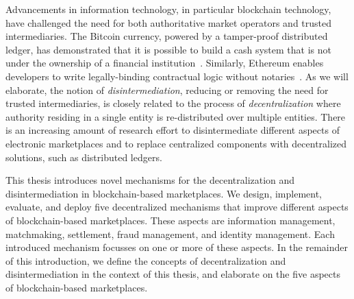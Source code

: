 Advancements in information technology, in particular blockchain technology, have challenged the need for both authoritative market operators and trusted intermediaries.
The Bitcoin currency, powered by a tamper-proof distributed ledger, has demonstrated that it is possible to build a cash system that is not under the ownership of a financial institution~\cite{nakamoto2008bitcoin}.
Similarly, Ethereum enables developers to write legally-binding contractual logic without notaries~\cite{wood2014ethereum}.
As we will elaborate, the notion of \emph{disintermediation}, reducing or removing the need for trusted intermediaries, is closely related to the process of \emph{decentralization} where authority residing in a single entity is re-distributed over multiple entities.
There is an increasing amount of research effort to disintermediate different aspects of electronic marketplaces and to replace centralized components with decentralized solutions, such as distributed ledgers.


This thesis introduces novel mechanisms for the decentralization and disintermediation in blockchain-based marketplaces.
We design, implement, evaluate, and deploy five decentralized mechanisms that improve different aspects of blockchain-based marketplaces.
These aspects are information management, matchmaking, settlement, fraud management, and identity management.
Each introduced mechanism focusses on one or more of these aspects.
In the remainder of this introduction, we define the concepts of decentralization and disintermediation in the context of this thesis, and elaborate on the five aspects of blockchain-based marketplaces.

